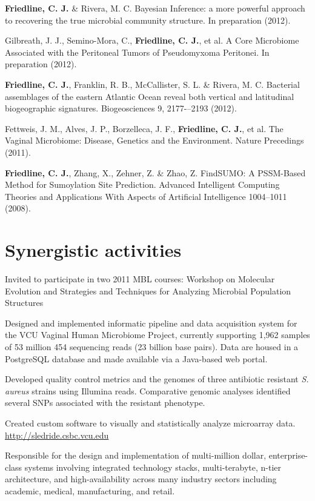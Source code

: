 \begin{packed_item}
	\item{\textbf{Friedline, C. J.} \& Rivera, M. C. Bayesian Inference: a more powerful approach to recovering the 
	true microbial community structure. In preparation (2012).}
	
	\item{Gilbreath, J. J., Semino-Mora, C., \textbf{Friedline, C. J.}, et al. A Core Microbiome Associated 
	with the Peritoneal Tumors of Pseudomyxoma Peritonei. In preparation (2012).}
	
	\item{\textbf{Friedline, C. J.}, Franklin, R. B., McCallister, S. L. \& Rivera, M. C. Bacterial assemblages of the 
	eastern Atlantic Ocean reveal both vertical and latitudinal biogeographic signatures. 
	Biogeosciences 9, 2177-–2193 (2012).}
	
	\item{Fettweis, J. M., Alves, J. P., Borzelleca, J. F., \textbf{Friedline, C. J.}, et al. The Vaginal Microbiome: 
	Disease, Genetics and the Environment. Nature Precedings (2011).}
	
	\item{\textbf{Friedline, C. J.}, Zhang, X., Zehner, Z. \& Zhao, Z. FindSUMO: A PSSM-Based Method for 
	Sumoylation Site Prediction. Advanced Intelligent Computing Theories and Applications With Aspects 
	of Artificial Intelligence 1004--1011 (2008).}
\end{packed_item}

\section{Synergistic activities}
\begin{packed_item}
	\item{Invited to participate in two 2011 MBL courses: Workshop on Molecular Evolution and Strategies 
	and Techniques for Analyzing Microbial Population Structures}
	\item{Designed and implemented informatic pipeline and data acquisition system for the VCU Vaginal Human Microbiome 
	Project, currently supporting 1,962 samples of 53 million 454 sequencing reads (23 billion base pairs).  Data 
	are housed in a PostgreSQL database and made available via a Java-based web portal.}
	\item{Developed quality control metrics and the genomes of three antibiotic resistant \textit{S. aureus} strains using Illumina reads. 
	Comparative genomic analyses identified several SNPs associated with the resistant phenotype.}
	\item{Created custom software to visually and statistically analyze microarray data.\\
	 \url{http://sledride.csbc.vcu.edu}}
	\item{Responsible for the design and implementation of multi-million dollar, enterprise-class systems involving 
	integrated technology stacks, multi-terabyte, n-tier architecture, and high-availability across many industry 
	sectors including academic, medical, manufacturing, and retail.}
\end{packed_item}

